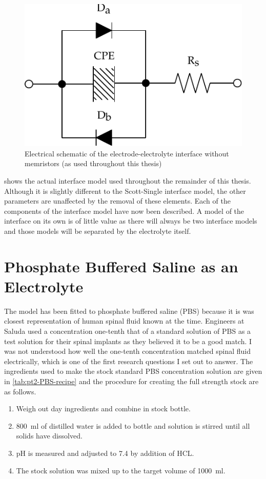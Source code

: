     \begin{figure}
      \centering
      \includegraphics{content/pt2/07-InterfaceModel/graphics/interfaceSchematic_noMemristive}
      \caption{\label{fig:pt2-interfaceSchematic_noMemristive}Electrical schematic of the electrode-electrolyte interface without memristors (as used throughout this thesis)}
    \end{figure}

     shows the actual interface model used throughout the remainder of this thesis.
    Although it is slightly different to the Scott-Single interface model, the other parameters are unaffected by the removal of these elements.
    Each of the components of the interface model have now been described.
    A model of the interface on its own is of little value as there will always be two interface models and those models will be separated by the electrolyte itself.


\section{Phosphate Buffered Saline as an Electrolyte}


  The model has been fitted to phosphate buffered saline (PBS) because it is was closest representation of human spinal fluid known at the time.
  Engineers at Saluda used a concentration one-tenth that of a standard solution of PBS as a test solution for their spinal implants as they believed it to be a good match.
  I was not understood how well the one-tenth concentration matched spinal fluid electrically, which is one of the first research questions I set out to answer.
  The ingredients used to make the stock standard PBS concentration solution are given in \cref{tab:pt2-PBS-recipe} and the procedure for creating the full strength stock are as follows.
  \begin{enumerate}
    \item Weigh out day ingredients and combine in stock bottle.
    \item \SI{800}{\milli\litre} of distilled water is added to bottle and solution is stirred until all solids have dissolved.
    \item pH is measured and adjusted to 7.4 by addition of HCL.
    \item The stock solution was mixed up to the target volume of \SI{1000}{\milli\litre}.
  \end{enumerate}

